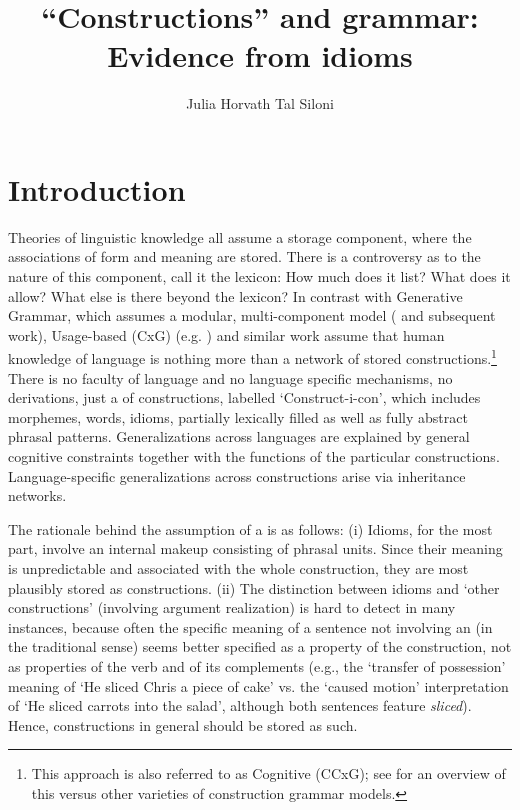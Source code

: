 \documentclass[output=paper,
modfonts
]{LSP/langsci}
\title{``Constructions'' and grammar: Evidence from idioms}
\author{%
Julia Horvath\affiliation{Tel Aviv University}\lastand 
Tal Siloni\affiliation{Tel Aviv University}
}
\begin{document}
\maketitle

\section{Introduction}
Theories of linguistic knowledge all assume a storage component, where
the associations of form and meaning are stored. There is a controversy as to the nature of this component, call it the lexicon: How much does it list? What does it allow? What else is there beyond the lexicon? In
contrast with Generative Grammar, which assumes a modular,
multi-component model (\citealt{chomsky1965} and subsequent work), Usage-based
 (CxG) (e.g. \citealt{goldberg2006}) and similar work assume
that human knowledge of language is nothing more than a network of
stored constructions.\footnote{This approach is also referred to as Cognitive 
(CCxG); see \citet{boas2013} for an overview of this versus other varieties
of construction grammar models.} There is no faculty of language and no language specific mechanisms, no derivations, just a  of constructions, labelled `Construct-i-con', 
which includes morphemes, words, idioms, partially lexically filled as well 
as fully abstract phrasal patterns. Generalizations across languages are explained 
by general cognitive constraints together with the functions of the
particular constructions. Language-specific generalizations across
constructions arise via inheritance networks.

The rationale behind the assumption of a  is as follows:
(i) Idioms, for the most part, involve an internal makeup consisting of
phrasal units. Since their meaning is unpredictable and associated with
the whole construction, they are most plausibly stored as constructions.
(ii) The distinction between idioms and `other constructions' (involving
argument realization) is hard to detect in many instances, because often
the specific meaning of a sentence not involving an  (in the
traditional sense) seems better specified as a property of the
construction, not as properties of the verb and of its complements
(e.g., the `transfer of possession' meaning of `He sliced Chris a piece
of cake' vs. the `caused motion' interpretation of `He sliced carrots
into the salad', although both sentences feature \emph{sliced}). Hence,
constructions in general should be stored as such.
\end{document}
